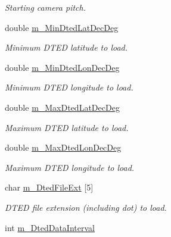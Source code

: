 \begin{DoxyCompactItemize}
\begin{DoxyCompactList}\small\item\em Starting camera pitch. \end{DoxyCompactList}\item 
\hypertarget{class_viewer3_d_a9fe3ae08a93b7dc8a29d90cf53405d63}{
double \hyperlink{class_viewer3_d_a9fe3ae08a93b7dc8a29d90cf53405d63}{m\_\-MinDtedLatDecDeg}}
\label{class_viewer3_d_a9fe3ae08a93b7dc8a29d90cf53405d63}

\begin{DoxyCompactList}\small\item\em Minimum DTED latitude to load. \end{DoxyCompactList}\item 
\hypertarget{class_viewer3_d_a3137040fcfc917babb5c53aff1c6bd0b}{
double \hyperlink{class_viewer3_d_a3137040fcfc917babb5c53aff1c6bd0b}{m\_\-MinDtedLonDecDeg}}
\label{class_viewer3_d_a3137040fcfc917babb5c53aff1c6bd0b}

\begin{DoxyCompactList}\small\item\em Minimum DTED longitude to load. \end{DoxyCompactList}\item 
\hypertarget{class_viewer3_d_ae115696fbda654685112f500bde88b25}{
double \hyperlink{class_viewer3_d_ae115696fbda654685112f500bde88b25}{m\_\-MaxDtedLatDecDeg}}
\label{class_viewer3_d_ae115696fbda654685112f500bde88b25}

\begin{DoxyCompactList}\small\item\em Maximum DTED latitude to load. \end{DoxyCompactList}\item 
\hypertarget{class_viewer3_d_a426b0f3d2ce010a97995edbcb8f81d20}{
double \hyperlink{class_viewer3_d_a426b0f3d2ce010a97995edbcb8f81d20}{m\_\-MaxDtedLonDecDeg}}
\label{class_viewer3_d_a426b0f3d2ce010a97995edbcb8f81d20}

\begin{DoxyCompactList}\small\item\em Maximum DTED longitude to load. \end{DoxyCompactList}\item 
\hypertarget{class_viewer3_d_a75ce22704e9c7fe96daf3ca9eecdb5f4}{
char \hyperlink{class_viewer3_d_a75ce22704e9c7fe96daf3ca9eecdb5f4}{m\_\-DtedFileExt} \mbox{[}5\mbox{]}}
\label{class_viewer3_d_a75ce22704e9c7fe96daf3ca9eecdb5f4}

\begin{DoxyCompactList}\small\item\em DTED file extension (including dot) to load. \end{DoxyCompactList}\item 
\hypertarget{class_viewer3_d_a5b82c69fff165d1876faeae21f0dc925}{
int \hyperlink{class_viewer3_d_a5b82c69fff165d1876faeae21f0dc925}{m\_\-DtedDataInterval}}
\label{class_viewer3_d_a5b82c69fff165d1876faeae21f0dc925}


\end{DoxyCompactItemize}
